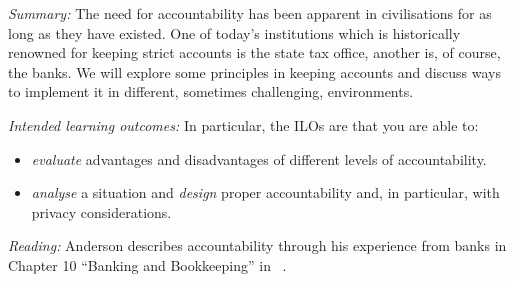 \emph{Summary:}
The need for accountability has been apparent in civilisations for as long as 
they have existed.
One of today's institutions which is historically renowned for keeping strict 
accounts is the state tax office, another is, of course, the banks.
We will explore some principles in keeping accounts and discuss ways to 
implement it in different, sometimes challenging, environments.

\emph{Intended learning outcomes:}
In particular, the \acp{ILO} are that you are able to:
\begin{itemize}
  \item \emph{evaluate} advantages and disadvantages of different levels of 
    accountability.
  \item \emph{analyse} a situation and \emph{design} proper accountability and,
    in particular, with privacy considerations.
\end{itemize}

\emph{Reading:}
Anderson describes accountability through his experience from banks in Chapter 
10 \enquote{Banking and Bookkeeping} in 
   ~\cite{Anderson2008sea}.
